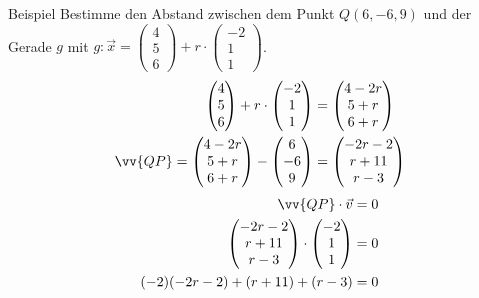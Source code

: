 \documentclass{article}
\begin{document}
\begin{boxx}[DarkBlue]{Beispiel}
    Bestimme den Abstand zwischen dem Punkt $Q(6,-6,9)$
    und der Gerade $g$ mit $\displaystyle g: \vec{x} = \begin{pmatrix}4\\5\\6\end{pmatrix} + r \cdot \begin{pmatrix}-2\\1\\1\end{pmatrix}$.
    \begin{align*}
        \begin{pmatrix}4\\5\\6\end{pmatrix} + r \cdot \begin{pmatrix}-2\\1\\1\end{pmatrix} &= \begin{pmatrix}4-2r\\5+r\\6+r\end{pmatrix} \\
        \vv{QP} = \begin{pmatrix}4-2r\\5+r\\6+r\end{pmatrix} - \begin{pmatrix}6\\-6\\9\end{pmatrix} &= \begin{pmatrix}-2r-2\\r+11\\r-3\end{pmatrix} 
    \end{align*}
    \begin{align*}
        \vv{QP} \cdot \vec{v} &= 0 \\
        \begin{pmatrix}-2r-2\\r+11\\r-3\end{pmatrix} \cdot \begin{pmatrix}-2\\1\\1\end{pmatrix} &= 0 \\
        (-2)(-2r-2) + (r+11) + (r-3) &= 0 \\

\end{align*}
\end{boxx}
\end{document}
